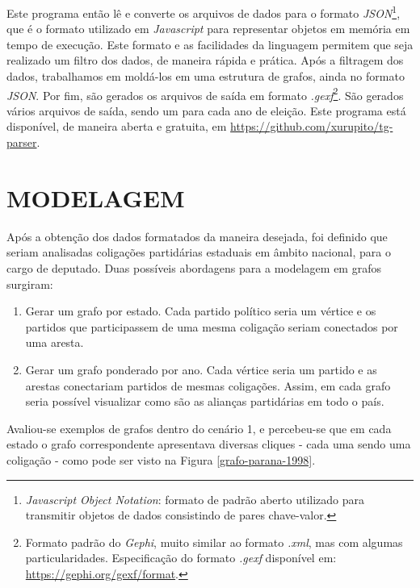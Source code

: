 Este programa então lê e converte os arquivos de dados para o formato \emph{JSON}\footnote{\emph{Javascript Object Notation}: formato de padrão aberto utilizado para transmitir objetos de dados consistindo de pares chave-valor.}, que é o formato utilizado em \emph{Javascript} para representar objetos em memória em tempo de execução. Este formato e as facilidades da linguagem permitem que seja realizado um filtro dos dados, de maneira rápida e prática. Após a filtragem dos dados, trabalhamos em moldá-los em uma estrutura de grafos, ainda no formato \emph{JSON}. Por fim, são gerados os arquivos de saída em formato \emph{.gexf}\footnote{Formato padrão do \emph{Gephi}, muito similar ao formato \emph{.xml}, mas com algumas particularidades. Especificação do formato \emph{.gexf} disponível em: \url{https://gephi.org/gexf/format}.}. São gerados vários arquivos de saída, sendo um para cada ano de eleição. Este programa está disponível, de maneira aberta e gratuita, em \url{https://github.com/xurupito/tg-parser}.

\section{\texorpdfstring{\MakeUppercase{Modelagem}}{}}
\label{proposta__modelagem}

Após a obtenção dos dados formatados da maneira desejada, foi definido que seriam analisadas coligações partidárias estaduais em âmbito nacional, para o cargo de deputado. Duas possíveis abordagens para a modelagem em grafos surgiram:
\begin{enumerate}
    \item Gerar um grafo por estado. Cada partido político seria um vértice e os partidos que participassem de uma mesma coligação seriam conectados por uma aresta.
    \item Gerar um grafo ponderado por ano. Cada vértice seria um partido e as arestas conectariam partidos de mesmas coligações. Assim, em cada grafo seria possível visualizar como são as alianças partidárias em todo o país.
\end{enumerate}

Avaliou-se exemplos de grafos dentro do cenário 1, e percebeu-se que em cada estado o grafo correspondente apresentava diversas cliques - cada uma sendo uma coligação - como pode ser visto na Figura \ref{grafo-parana-1998}.

